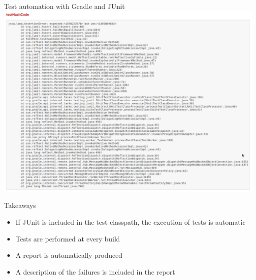 \documentclass[presentation]{beamer}
\begin{document}
\begin{frame}{Test automation with Gradle and JUnit}
    \includegraphics[width=.9\textwidth,height=.8\textheight,keepaspectratio]{img/gradleTestReport3}
    \begin{block}{Takeaways}
        \begin{itemize}
            \item If JUnit is included in the test classpath, the execution of tests is automatic
            \item Tests are performed at every build
            \item A report is automatically produced
            \item A description of the failures is included in the report
        \end{itemize}
    \end{block}
\end{frame}
\end{document}
